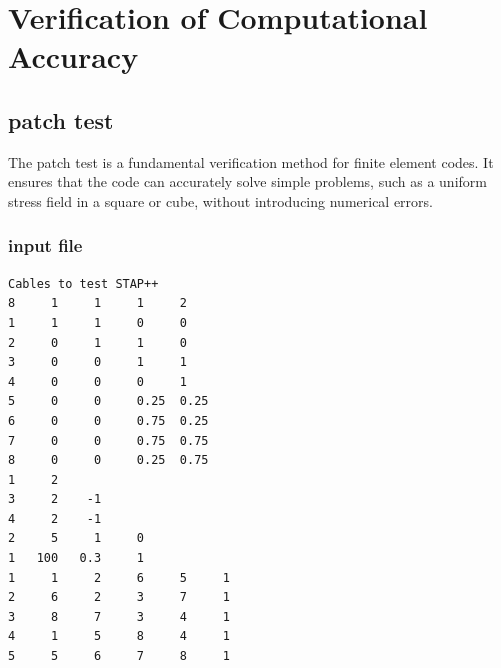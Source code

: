\documentclass[a4paper,12pt]{report}
\begin{document}
\chapter{Verification of Computational Accuracy}
\section{patch test}
The patch test is a fundamental verification method for finite element codes. It ensures that the code can accurately solve simple problems, such as a uniform stress field in a square or cube, without introducing numerical errors.
\subsection{input file}
\begin{lstlisting}[basicstyle=\ttfamily, frame=single, caption={patch\_test.dat}]
 Cables to test STAP++
8     1     1     1     2
1     1     1     0     0
2     0     1     1     0
3     0     0     1     1
4     0     0     0     1
5     0     0     0.25  0.25
6     0     0     0.75  0.25
7     0     0     0.75  0.75
8     0     0     0.25  0.75
1     2
3     2    -1
4     2    -1
2     5     1     0
1   100   0.3     1
1     1     2     6     5     1
2     6     2     3     7     1
3     8     7     3     4     1
4     1     5     8     4     1
5     5     6     7     8     1
\end{lstlisting} 
\end{document}
